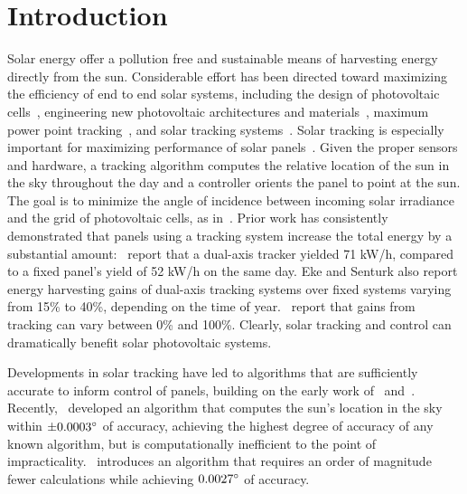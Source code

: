 \documentclass[11pt]{article}
\begin{document}
\section{Introduction}
Solar energy offer a pollution free and sustainable means of harvesting energy directly from the sun. Considerable effort has been directed toward maximizing the efficiency of end to end solar systems, including the design of photovoltaic cells~\cite{Jervase2001,li2012molecular}, engineering new photovoltaic architectures and materials~\cite{li2005high}, maximum power point tracking~\cite{hua2004modified,Hussein1995}, and solar tracking systems~\cite{camacho2012control}. Solar tracking is especially important for maximizing performance of solar panels~\cite{Eke2012,Rizk2008,King2001}. Given the proper sensors and hardware, a tracking algorithm computes the relative location of the sun in the sky throughout the day and a controller orients the panel to point at the sun. The goal is to minimize the angle of incidence between incoming solar irradiance and the grid of photovoltaic cells, as in~\citet{Eke2012,Benghanem2011,King2001, kalogirou1996design}. Prior work has consistently demonstrated that panels using a tracking system increase the total energy by a substantial amount:~\citet{Eke2012} report that a dual-axis tracker yielded 71 kW/h, compared to a fixed panel's yield of 52 kW/h on the same day. Eke and Senturk also report energy harvesting gains of dual-axis tracking systems over fixed systems varying from 15\% to 40\%, depending on the time of year.~\citet{mousazadeh2009review} report that gains from tracking can vary between 0\% and 100\%. Clearly, solar tracking and control can dramatically benefit solar photovoltaic systems.

Developments in solar tracking have led to algorithms that are sufficiently accurate to inform control of panels, building on the early work of~\citet{spencer1971fourier,walraven1978calculating} and~\citet{michalsky1988astronomical}. Recently,~\citet{reda2004solar} developed an algorithm that computes the sun's location in the sky within $\pm 0.0003\degree$ of accuracy, achieving the highest degree of accuracy of any known algorithm, but is computationally inefficient to the point of impracticality.~\citet{Grena2008} introduces an algorithm that requires an order of magnitude fewer calculations while achieving $0.0027\degree$ of accuracy.
\end{document}
